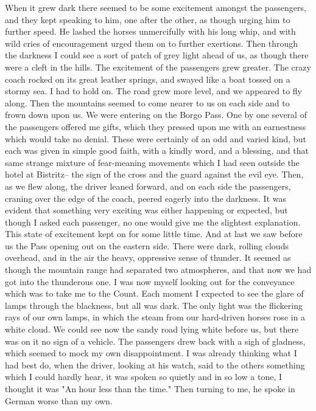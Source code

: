When it grew dark there seemed to be some excitement amongst the passengers, and they kept speaking to him, one after the other, as though urging him to further speed. He lashed the horses unmercifully with his long whip, and with wild cries of encouragement urged them on to further exertions. Then through the darkness I could see a sort of patch of grey light ahead of us, as though there were a cleft in the hills. The excitement of the passengers grew greater. The crazy coach rocked on its great leather springs, and swayed like a boat tossed on a stormy sea. I had to hold on. The road grew more level, and we appeared to fly along. Then the mountains seemed to come nearer to us on each side and to frown down upon us. We were entering on the Borgo Pass. One by one several of the passengers offered me gifts, which they pressed upon me with an earnestness which would take no denial. These were certainly of an odd and varied kind, but each was given in simple good faith, with a kindly word, and a blessing, and that same strange mixture of fear-meaning movements which I had seen outside the hotel at Bistritz-- the sign of the cross and the guard against the evil eye. Then, as we flew along, the driver leaned forward, and on each side the passengers, craning over the edge of the coach, peered eagerly into the darkness. It was evident that something very exciting was either happening or expected, but though I asked each passenger, no one would give me the slightest explanation. This state of excitement kept on for some little time. And at last we saw before us the Pass opening out on the eastern side. There were dark, rolling clouds overhead, and in the air the heavy, oppressive sense of thunder. It seemed as though the mountain range had separated two atmospheres, and that now we had got into the thunderous one. I was now myself looking out for the conveyance which was to take me to the Count. Each moment I expected to see the glare of lamps through the blackness, but all was dark. The only light was the flickering rays of our own lamps, in which the steam from our hard-driven horses rose in a white cloud. We could see now the sandy road lying white before us, but there was on it no sign of a vehicle. The passengers drew back with a sigh of gladness, which seemed to mock my own disappointment. I was already thinking what I had best do, when the driver, looking at his watch, said to the others something which I could hardly hear, it was spoken so quietly and in so low a tone, I thought it was "An hour less than the time." Then turning to me, he spoke in German worse than my own.

